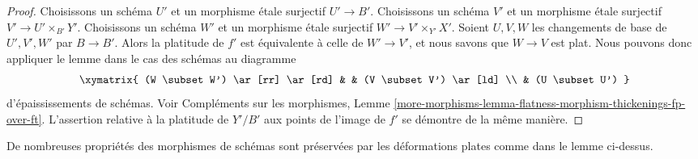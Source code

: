 \begin{proof}
Choisissons un schéma $U'$ et un morphisme étale surjectif $U' \to B'$.
Choisissons un schéma $V'$ et un morphisme étale surjectif
$V' \to U' \times_{B'} Y'$.
Choisissons un schéma $W'$ et un morphisme étale surjectif
$W' \to V' \times_{Y'} X'$. Soient $U, V, W$ les changements de base
de $U', V', W'$ par $B \to B'$. Alors la platitude de $f'$ est
équivalente à celle de $W' \to V'$, et nous savons
que $W \to V$ est plat. Nous pouvons donc appliquer le lemme
dans le cas des schémas au diagramme
$$
\xymatrix{
(W \subset W') \ar[rr] \ar[rd] & & (V \subset V') \ar[ld] \\
& (U \subset U')
}
$$
d'épaississements de schémas. Voir
Compléments sur les morphismes, Lemme
\ref{more-morphisms-lemma-flatness-morphism-thickenings-fp-over-ft}.
L'assertion relative à la platitude de $Y'/B'$ aux points de
l'image de $f'$ se démontre de la même manière.
\end{proof}

\noindent
De nombreuses propriétés des morphismes de schémas sont préservées par les
déformations plates comme dans le lemme ci-dessus.

